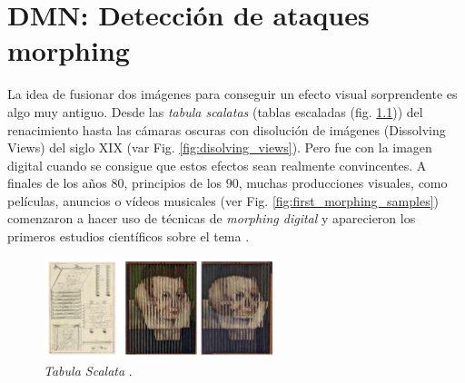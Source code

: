 \chapter{DMN: Detección de ataques morphing\label{ch:morphing}}


La idea de fusionar dos imágenes para conseguir un efecto visual sorprendente es algo muy antiguo. Desde las \textit{tabula scalatas} (tablas escaladas (fig. \ref{fig:tabula_scalata})) del renacimiento hasta las cámaras oscuras con disolución de imágenes (Dissolving Views) del siglo XIX (var Fig. \ref{fig:disolving_views}). Pero fue con la imagen digital cuando se consigue que estos efectos sean realmente convincentes. A finales de los años $80$, principios de los $90$, muchas producciones visuales, como películas, anuncios o vídeos musicales (ver Fig. \ref{fig:first_morphing_samples}) comenzaron a hacer uso de técnicas de \textit{\gls{morphing} digital} y aparecieron los primeros estudios científicos sobre el tema \cite{lee1998polymorph} \cite{ucicr1992feature}.

\begin{figure}[h!]
    \centering
    \includegraphics[width=0.6\textwidth]{ch-sistemasABC/images/ch-morphing/old/tabula_scalata.png}
    \caption{\textit{Tabula Scalata} \cite{rodrigo2011anamorfosis}.}
    \label{fig:tabula_scalata}
\end{figure}

